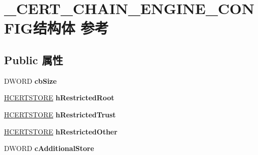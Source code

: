 \hypertarget{struct___c_e_r_t___c_h_a_i_n___e_n_g_i_n_e___c_o_n_f_i_g}{}\section{\+\_\+\+C\+E\+R\+T\+\_\+\+C\+H\+A\+I\+N\+\_\+\+E\+N\+G\+I\+N\+E\+\_\+\+C\+O\+N\+F\+I\+G结构体 参考}
\label{struct___c_e_r_t___c_h_a_i_n___e_n_g_i_n_e___c_o_n_f_i_g}
\subsection*{Public 属性}
\begin{DoxyCompactItemize}
\item 
\mbox{\label{struct___c_e_r_t___c_h_a_i_n___e_n_g_i_n_e___c_o_n_f_i_g_acaecbed1ba33ec9797ba396980c4be96}} 
D\+W\+O\+RD {\bfseries cb\+Size}
\item 
\mbox{\label{struct___c_e_r_t___c_h_a_i_n___e_n_g_i_n_e___c_o_n_f_i_g_a0e99f2f25a4608d0844f7d8a3b3d7d28}} 
\hyperlink{interfacevoid}{H\+C\+E\+R\+T\+S\+T\+O\+RE} {\bfseries h\+Restricted\+Root}
\item 
\mbox{\label{struct___c_e_r_t___c_h_a_i_n___e_n_g_i_n_e___c_o_n_f_i_g_a058c5c5f09466d676dd12aef5f98b73c}} 
\hyperlink{interfacevoid}{H\+C\+E\+R\+T\+S\+T\+O\+RE} {\bfseries h\+Restricted\+Trust}
\item 
\mbox{\label{struct___c_e_r_t___c_h_a_i_n___e_n_g_i_n_e___c_o_n_f_i_g_a31c9b30b8ea8aa3d71ebbf8742d0dbec}} 
\hyperlink{interfacevoid}{H\+C\+E\+R\+T\+S\+T\+O\+RE} {\bfseries h\+Restricted\+Other}
\item 
\mbox{\label{struct___c_e_r_t___c_h_a_i_n___e_n_g_i_n_e___c_o_n_f_i_g_ae571a5c8e73cb9f897818b1900da4254}} 
D\+W\+O\+RD {\bfseries c\+Additional\+Store}
\item 
\mbox{\label{struct___c_e_r_t___c_h_a_i_n___e_n_g_i_n_e___c_o_n_f_i_g_a7b0041de82f992983920af47d1b16e06}} 

\end{DoxyCompactItemize}
